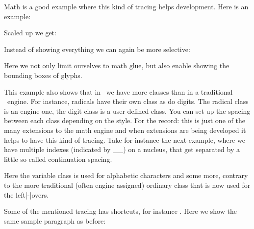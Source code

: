 \stopsectionlevel

\startsectionlevel[title=Math]

Math is a good example where this kind of tracing helps development. Here is an
example:

\startbuffer
{}
\stopbuffer

\typebuffer

Scaled up we get:

\blank[2*big]

\startlinecorrection
\scale[height=2cm]{\inlinebuffer}
\stoplinecorrection

\blank[2*big]

Instead of showing everything we can again be more selective:

\startbuffer
{}
\stopbuffer

\typebuffer

Here we not only limit ourselves to math glue, but also enable showing the
bounding boxes of glyphs.

\startlinecorrection
\scale[height=2cm]{\inlinebuffer}
\stoplinecorrection

This example also shows that in \LUAMETATEX\ we have more classes than in a
traditional \TEX\ engine. For instance, radicals have their own class as do
digits. The radical class is an engine one, the digit class is a user defined
class. You can set up the spacing between each class depending on the style. For
the record: this is just one of the many extensions to the math engine and when
extensions are being developed it helps to have this kind of tracing. Take for
instance the next example, where we have multiple indexes (indicated by \type
{__}) on a nucleus, that get separated by a little so called continuation
spacing.

\startbuffer
{}
\stopbuffer

\typebuffer

\startlinecorrection
\scale[height=2cm]{\inlinebuffer}
\stoplinecorrection

Here the variable class is used for alphabetic characters and some more, contrary
to the more traditional (often engine assigned) ordinary class that is now used
for the left|-|overs.

\stopsectionlevel

\startsectionlevel[title=Fonts]

Some of the mentioned tracing has shortcuts, for instance \typ {\showglyphs}.
Here we show the same sample paragraph as before:

